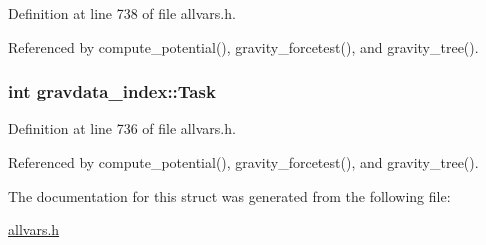 Definition at line 738 of file allvars.h.



Referenced by compute\_\-potential(), gravity\_\-forcetest(), and gravity\_\-tree().

\hypertarget{structgravdata__index_afacf7009bcd9677cf8ddff3dc927d6c5}{
\subsubsection[{Task}]{\setlength{\rightskip}{0pt plus 5cm}int {\bf gravdata\_\-index::Task}}}
\label{structgravdata__index_afacf7009bcd9677cf8ddff3dc927d6c5}


Definition at line 736 of file allvars.h.



Referenced by compute\_\-potential(), gravity\_\-forcetest(), and gravity\_\-tree().



The documentation for this struct was generated from the following file:\begin{DoxyCompactItemize}
\item 
\hyperlink{allvars_8h}{allvars.h}\end{DoxyCompactItemize}
